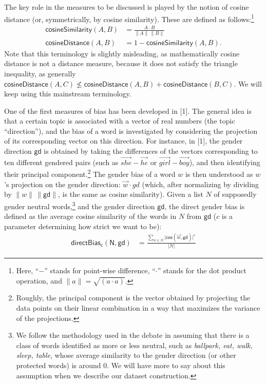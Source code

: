 \documentclass[
  12pt,
  dvipsnames,enabledeprecatedfontcommands]{scrartcl}
\begin{document}
The key role in the measures to be discussed is played by the notion of
cosine distance (or, symmetrically, by cosine similarity). These are
defined as follows:\footnote{Here, ``\(-\)'' stands for point-wise
  difference, ``\(\cdot\)'' stands for the dot product operation, and
  \(\lVert a\rVert = \sqrt{(a \cdot a)}\).} \begin{align} \tag{Sim}
\mathsf{cosineSimilarity}(A,B) & = \frac{A \cdot B}{\lVert  A \rVert \,\lVert B \rVert}
\\
\tag{Distance}
\mathsf{cosineDistance}(A,B) &  = 1 - \mathsf{cosineSimilarity}(A,B).
\end{align} Note that this terminology is slightly misleading, as
mathematically cosine distance is not a distance measure, because it
does not satisfy the triangle inequality, as generally
\(\mathsf{cosineDistance}(A,C) \not \leq \mathsf{cosineDistance}(A,B)+ \mathsf{cosineDistance}(B,C)\).
We will keep using this mainstream terminology.

One of the first measures of bias has been developed in {[}1{]}. The
general idea is that a certain topic is associated with a vector of real
numbers (the topic ``direction''), and the bias of a word is
investigated by considering the projection of its corresponding vector
on this direction. For instance, in {[}1{]}, the gender direction
\(\mathsf{gd}\) is obtained by taking the differences of the vectors
corresponding to ten different gendered pairs (such as
\(\overrightarrow{she} - \overrightarrow{he}\) or
\(\overrightarrow{girl} - \overrightarrow{boy}\)), and then identifying
their principal component.\footnote{Roughly, the principal component is
  the vector obtained by projecting the data points on their linear
  combination in a way that maximizes the variance of the projections.}
The gender bias of a word \(w\) is then understood as \(w\)'s projection
on the gender direction: \(\vec{w} \cdot gd\) (which, after normalizing
by dividing by \(\lVert w \rVert \,\lVert \mathsf{gd} \rVert\), is the
same as cosine similarity). Given a list \(N\) of supposedly gender
neutral words,\footnote{We follow the methodology used in the debate in
  assuming that there is a class of words identified as more or less
  neutral, such as \emph{ballpark, eat, walk, sleep, table}, whose
  average similarity to the gender direction (or other protected words)
  is around 0. We will have more to say about this assumption when we
  describe our dataset construction.} and the gender direction
\(\mathsf{gd}\), the direct gender bias is defined as the average cosine
similarity of the words in \(N\) from \(\mathsf{gd}\) (\(c\) is a
parameter determining how strict we want to be): \begin{align*}
\mathsf{directBias_c(N,gd)} & = \frac{\sum_{w\in N}\vert \mathsf{cos}(\vec{w},\mathsf{gd})\vert^c}{\vert N \vert }
\end{align*} \normalsize 
\end{document}
